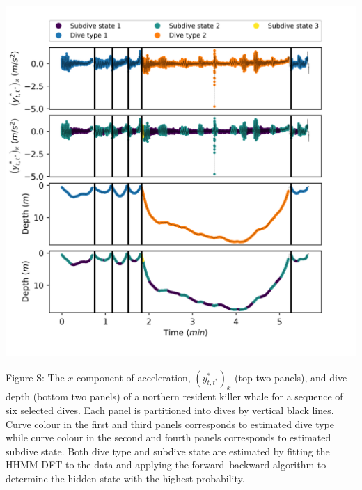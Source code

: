 \documentclass{article}
\begin{document}
        \begin{center}
        \includegraphics[width=6in]{../Plots/2019/20190902-182840-CATs_OB_1_0_267_HHMM_decoded_dives.png}
        \end{center}
        
        \noindent Figure S: The $x$-component of acceleration, $(y^*_{t,t^*})_x$ (top two panels), and dive depth (bottom two panels) of a northern resident killer whale for a sequence of six selected dives. Each panel is partitioned into dives by vertical black lines. Curve colour in the first and third panels corresponds to estimated dive type while curve colour in the second and fourth panels corresponds to estimated subdive state. Both dive type and subdive state are estimated by fitting the HHMM-DFT to the data and applying the forward--backward algorithm to determine the hidden state with the highest probability.
        \addtocounter{fignum}{1}
        
\end{document}
